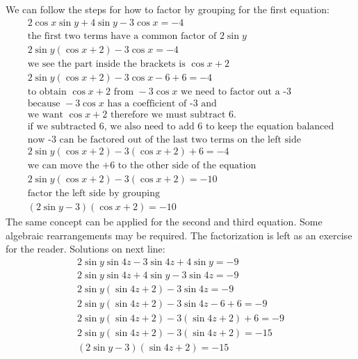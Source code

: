 \documentclass[a4paper,12pt]{article}
\begin{document}
We can follow the steps for how to factor by grouping for the first equation:
\begin{equation}
    \begin{split}
        2\cos x\sin y+ 4\sin y-3\cos x = -4\\
        \text{the first two terms have a common factor of } 2\sin y \\
        2\sin y(\cos x+2) - 3\cos x = -4\\
        \text{we see the part inside the brackets is } \cos x+2 \\
        2\sin y(\cos x+2) - 3\cos x-6+6= -4\\
        \text{to obtain }\cos x+2\text{ from }-3\cos x\text{ we need to factor out a -3} \\
        \text{because } -3\cos x \text{ has a coefficient of -3 and} \\
        \text{we want }\cos x + 2 \text{ therefore we must subtract 6.} \\
        \text{if we subtracted 6, we also need to add 6 to keep the equation balanced} \\
        \text{now -3 can be factored out of the last two terms on the left side} \\
        2\sin y(\cos x+2) - 3(\cos x+2) + 6= -4\\
        \text{we can move the +6 to the other side of the equation} \\
        2\sin y(\cos x+2) - 3(\cos x+2)= -10\\
        \text{factor the left side by grouping} \\
        (2\sin y-3)(\cos x+2)= -10
    \end{split}
\end{equation}
The same concept can be applied for the second and third equation. Some algebraic rearrangements may be required. The factorization is left as an exercise for the reader. Solutions on next line:
\begin{equation}
    \begin{split}
        2\sin y\sin 4z-3\sin 4z+4\sin y=-9 \\
        2\sin y\sin 4z+4\sin y-3\sin 4z=-9 \\
        2\sin y(\sin 4z+2)-3\sin 4z=-9 \\
        2\sin y(\sin 4z+2)-3\sin 4z-6+6=-9 \\
        2\sin y(\sin 4z+2)-3(\sin 4z+2)+6=-9 \\
        2\sin y(\sin 4z+2)-3(\sin 4z+2)=-15 \\
        (2\sin y-3)(\sin 4z+2)=-15
    \end{split}
\end{equation}
\end{document}
